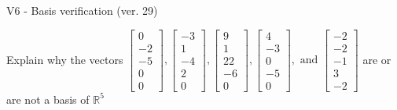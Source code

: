 \begin{exercise}
  \begin{exerciseTitle}V6 - Basis verification (ver. 29)\end{exerciseTitle}
  \begin{exerciseStatement}
    Explain why the vectors \(\left[\begin{array}{r}
0 \\
-2 \\
-5 \\
0 \\
0
\end{array}\right] , \left[\begin{array}{r}
-3 \\
1 \\
-4 \\
2 \\
0
\end{array}\right] , \left[\begin{array}{r}
9 \\
1 \\
22 \\
-6 \\
0
\end{array}\right] , \left[\begin{array}{r}
4 \\
-3 \\
0 \\
-5 \\
0
\end{array}\right] , \text{ and } \left[\begin{array}{r}
-2 \\
-2 \\
-1 \\
3 \\
-2
\end{array}\right]\) are or are not a basis of \(\mathbb{R}^5\)	



\end{exerciseStatement}
\end{exercise}
